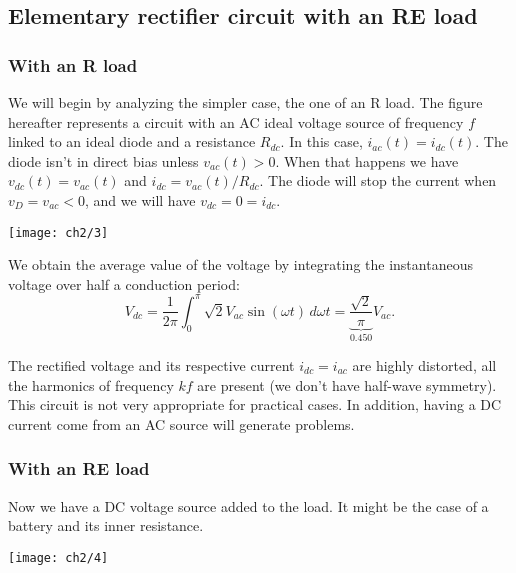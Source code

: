 		\subsection{Elementary rectifier circuit with an RE load}
			\subsubsection{With an R load}
			    We will begin by analyzing the simpler case, the one of an R load. The figure hereafter represents a circuit with an AC ideal voltage source of frequency $f$ linked to an ideal diode and a resistance $R_{dc}$. In this case, $i_{ac}(t)=i_{dc}(t)$. The diode isn't in direct bias unless $v_{ac}(t)>0$. When that happens we have $v_{dc}(t)=v_{ac}(t)$ and $i_{dc}=v_{ac}(t)/R_{dc}$. The diode will stop the current when $v_D=v_{ac}<0$, and we will have $v_{dc}=0=i_{dc}$.
				
				\begin{center}
					\texttt{[image: ch2/3]}
				\end{center}
				
				We obtain the average value of the voltage by integrating the instantaneous voltage over half a conduction period:
				\begin{equation}
					V_{dc} = \frac{1}{2\pi} \int _0^\pi \sqrt{2}V_{ac}\sin (\omega t) \, d\omega t = \underbrace{\frac{\sqrt{2}}{\pi}}_{0.450} V_{ac}.
					\label{eq:2.5}
				\end{equation}
				
				The rectified voltage and its respective current $i_{dc}=i_{ac}$ are highly distorted, all the harmonics of frequency $kf$ are present (we don't have half-wave symmetry). This circuit is not very appropriate for practical cases. In addition, having a DC current come from an AC source will generate problems. 
				
			\subsubsection{With an RE load}
			
			    Now we have a DC voltage source added to the load. It might be the case of a battery and its inner resistance. 
				
				\begin{center}
				\texttt{[image: ch2/4]}
				\end{center}	
				
